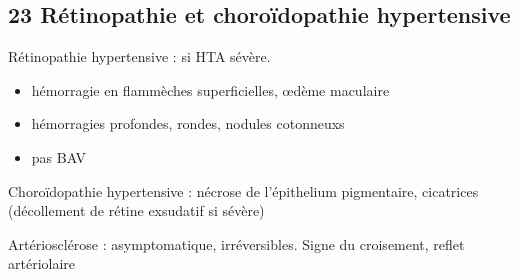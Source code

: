 \documentclass[11pt]{article}
\begin{document}
\subsection{23 Rétinopathie et choroïdopathie hypertensive}
\label{sec:orga454c39}
Rétinopathie hypertensive : si HTA sévère.
\begin{itemize}
\item hémorragie en flammèches superficielles, \oe{}dème maculaire
\item hémorragies profondes, rondes, nodules cotonneuxs
\item pas BAV
\end{itemize}
Choroïdopathie hypertensive : nécrose de l'épithelium pigmentaire, cicatrices
(décollement de rétine exsudatif si sévère)

Artériosclérose : asymptomatique, irréversibles. Signe du croisement, \inc reflet artériolaire
\end{document}
